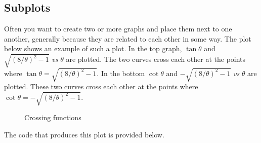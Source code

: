 \documentclass[letterpaper,10pt,english]{sphinxmanual}
\begin{document}
\subsection{Subplots}
\label{chap5/chap5_plot:subplots}
Often you want to create two or more graphs and place them next to one another, generally because they are related to each other in some way.  The plot below shows an example of such a plot.  In the top graph, $\tan\theta$ and $\sqrt{(8/\theta)^2-1}$ \emph{vs} $\theta$ are plotted.  The two curves cross each other at the points where $\tan\theta=\sqrt{(8/\theta)^2-1}$.  In the bottom  $\cot\theta$ and $-\sqrt{(8/\theta)^2-1}$ \emph{vs} $\theta$ are plotted.  These two curves cross each other at the points where $\cot\theta=-\sqrt{(8/\theta)^2-1}$.
\begin{figure}[htbp]
\centering
\capstart

\caption{Crossing functions}\label{chap5/chap5_plot:fig-subplotdemo}\end{figure}

The code that produces this plot is provided below.
\end{document}
